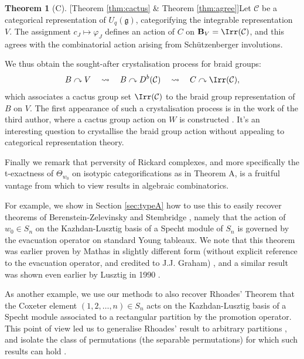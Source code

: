 \documentclass[11pt,reqno]{amsart}
\numberwithin{equation}{section}
\theoremstyle{definition}
\theoremstyle{named}
\newtheorem*{namedtheorem}{Theorem}
\newcommand{\bB}{\mathbf{B}}
\newcommand{\cC}{\mathcal{C}}
\newcommand{\fg}{\mathfrak{g}}
\begin{document}
\begin{namedtheorem}[C][Theorem \ref{thm:cactus} \& Theorem \ref{thm:agree}]\label{thm:C}
Let $\cC$ be a categorical representation of $U_q(\fg)$, categorifying the integrable representation $V$.  The assignment $c_J \mapsto \varphi_J$ defines an action of $C$ on $\bB_V=\Irr(\cC)$, and this  agrees with the combinatorial action arising from Sch\"utzenberger involutions.  
\end{namedtheorem}

We thus obtain the sought-after crystalisation process for braid groups:
$$
B \curvearrowright V \quad\rightsquigarrow\quad B \curvearrowright D^b(\cC) \quad\rightsquigarrow\quad C \curvearrowright \Irr(\cC),
$$
which  associates a cactus group set $\Irr(\cC)$ to the braid group representation of $B$ on $V$.  The first appearance of such a crystalisation process is in the work of the third author, where a cactus group action on $W$ is constructed \cite{LosCacti}.  It's an interesting  question to crystallise the braid group action without appealing to categorical representation theory.

Finally we remark that perversity of Rickard complexes, and more specifically the t-exactness of $\Theta_{w_0}$ on isotypic categorifications as in Theorem A, is a fruitful vantage from which to view results in algebraic combinatorics.  

For example, we show in Section \ref{sec:typeA} how to use this to easily recover theorems of Berenstein-Zelevinsky \cite{BZ96}  and Stembridge \cite{Stem96}, namely that the action of $w_0\in S_n$ 
on the Kazhdan-Lusztig basis of a Specht module of $S_n$ is governed by the evacuation operator  on standard Young tableaux.  We note that this theorem was earlier proven by Mathas in slightly different form (without explicit reference to the evacuation operator, and credited to J.J. Graham) \cite[Theorem 3.1]{Mathas}, and a similar result was shown even earlier by Lusztig in 1990 \cite[Corollary 5.9]{LusCBII}.

As another example, we use our methods to also recover Rhoades' Theorem that the Coxeter element $(1,2,\hdots,n) \in S_n$ acts on the  Kazhdan-Lusztig basis of a Specht module associated to a rectangular partition by the promotion operator.  This point of view led us to generalise Rhoades' result to arbitrary partitions \cite{GY1}, and isolate the class of permutations (the separable permutations) for which such results can hold \cite{GY2}.
\end{document}
